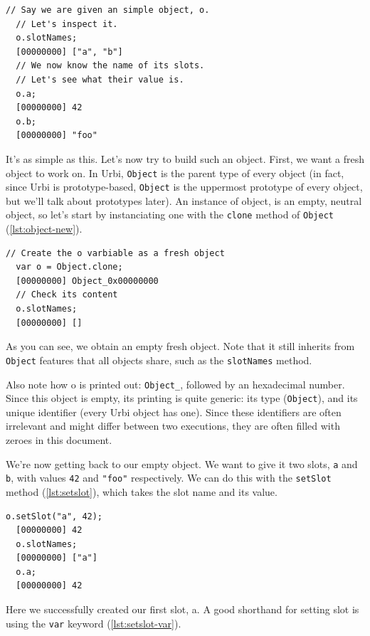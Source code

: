 \documentclass[openright,twoside,12pt]{report}
\newcommand{\urbi}{Urbi\xspace}
\newcommand{\lst}[1]{\autoref{lst:#1}}
\begin{document}
\begin{lstlisting}[caption=Inspecting an \urbi
  object,label=lst:object-slots]
  // Say we are given an simple object, o.
  // Let's inspect it.
  o.slotNames;
  [00000000] ["a", "b"]
  // We now know the name of its slots.
  // Let's see what their value is.
  o.a;
  [00000000] 42
  o.b;
  [00000000] "foo"
\end{lstlisting}

It's as simple as this. Let's now try to build such an object. First,
we want a fresh object to work on. In \urbi, \texttt{Object} is the
parent type of every object (in fact, since \urbi is prototype-based,
\texttt{Object} is the uppermost prototype of every object, but we'll
talk about prototypes later). An instance of object, is an empty,
neutral object, so let's start by instanciating one with the
\texttt{clone} method of \texttt{Object} (\lst{object-new}).

\begin{lstlisting}[caption=Instanciating a new object,
  label=lst:object-new]
  // Create the o varbiable as a fresh object
  var o = Object.clone;
  [00000000] Object_0x00000000
  // Check its content
  o.slotNames;
  [00000000] []
\end{lstlisting}

As you can see, we obtain an empty fresh object. Note that it still
inherits from \texttt{Object} features that all objects share, such as
the \texttt{slotNames} method.

Also note how o is printed out: \texttt{Object\_}, followed by an
hexadecimal number. Since this object is empty, its printing is quite
generic: its type (\texttt{Object}), and its unique identifier (every
\urbi object has one). Since these identifiers are often irrelevant
and might differ between two executions, they are often filled with
zeroes in this document.

We're now getting back to our empty object. We want to give it two
slots, \texttt{a} and \texttt{b}, with values \lstinline|42| and
\lstinline|"foo"| respectively. We can do this with the
\texttt{setSlot} method (\lst{setslot}), which takes the slot name and
its value.

\begin{lstlisting}[caption=Defining slots, label=lst:setslot]
  o.setSlot("a", 42);
  [00000000] 42
  o.slotNames;
  [00000000] ["a"]
  o.a;
  [00000000] 42
\end{lstlisting}

Here we successfully created our first slot, a. A good shorthand for
setting slot is using the \texttt{var} keyword (\lst{setslot-var}).
\end{document}

